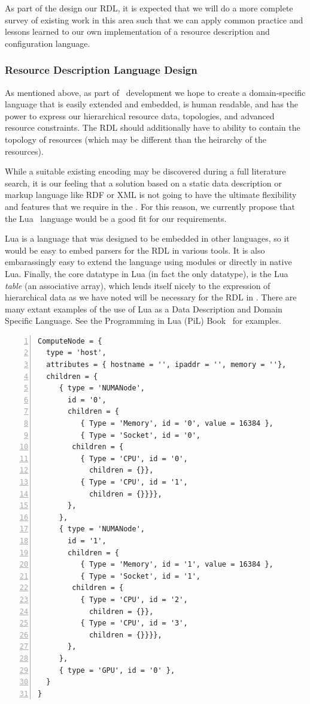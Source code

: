 As part of the design our RDL, it is expected that we will do a
more complete survey of existing work in this area such that we can
apply common practice and lessons learned to our own implementation
of a resource description and configuration language.

\subsubsection{Resource Description Language Design}

As mentioned above, as part of \ngrm\ development we hope to
create a domain-specific language that is
easily extended and embedded, is human readable, and has the
power to express our hierarchical resource data, topologies,
and advanced resource constraints. The RDL should additionally
have to ability to contain the topology of resources
(which may be different than the heirarchy of the resources).

While a suitable existing encoding may be discovered during
a full literature search, it is our feeling that a solution
based on a static data description or markup language like
RDF or XML is not going to have the ultimate flexibility and
features that we require in the \ngrm.  For this reason, we
currently propose that the Lua~\cite{LuaBook}
language would be a good fit for our requirements.

Lua is a language that was designed to be embedded in other
languages, so it would be easy to embed parsers for the RDL
in various tools. It is also embarassingly easy to extend the
language using modules or directly in native Lua. Finally,
the core datatype in Lua (in fact the only datatype), is
the Lua \emph{table} (an associative array), which lends
itself nicely to the expression of hierarchical data as
we have noted will be necessary for the RDL in \ngrm. There
are many extant examples of the use of Lua as a Data Description
and Domain Specific Language. See the Programming in Lua (PiL)
Book~\cite{LuaBook} for examples.

\lstset{ basicstyle=\footnotesize\tt }

\begin{lstlisting}[float=*htp, frame=single, numbers=left,
 caption={A na\"{\i}ve example of a Lua table describing an excessively simple resource hierarchy},
 label={lst:luaex1}]
ComputeNode = {
  type = 'host',
  attributes = { hostname = '', ipaddr = '', memory = ''},
  children = {
     { type = 'NUMANode',
       id = '0',
       children = {
          { Type = 'Memory', id = '0', value = 16384 },
          { Type = 'Socket', id = '0',
	    children = {
	      { Type = 'CPU', id = '0',
	        children = {}},
	      { Type = 'CPU', id = '1',
	        children = {}}}},
       },
     },
     { type = 'NUMANode',
       id = '1',
       children = {
          { Type = 'Memory', id = '1', value = 16384 },
          { Type = 'Socket', id = '1',
	    children = {
	      { Type = 'CPU', id = '2',
	        children = {}},
	      { Type = 'CPU', id = '3',
	        children = {}}}},
       },
     },
     { type = 'GPU', id = '0' },
  }
}
\end{lstlisting}


